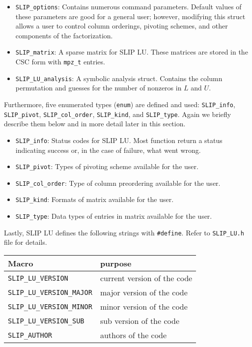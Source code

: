\documentclass[12pt]{article}
\theoremstyle{definition}
\begin{document}
\begin{itemize}
    \item \verb|SLIP_options|: Contains numerous command parameters. Default
    values of these parameters are good for a general user; however, modifying
    this struct allows a user to control column orderings, pivoting schemes,
    and other components of the factorization.

    \item \verb|SLIP_matrix|: A sparse matrix for SLIP LU. These matrices are
    stored in the CSC form with \verb|mpz_t| entries.

    \item \verb|SLIP_LU_analysis|: A symbolic analysis struct. Contains the
    column permutation and guesses for the number of nonzeros in $L$ and $U$.
\end{itemize}

Furthermore, five enumerated types (\verb|enum|) are defined and used:
\verb|SLIP_info|, \verb|SLIP_pivot|, \verb|SLIP_col_order|, \verb|SLIP_kind|,
and \verb|SLIP_type|. Again we briefly
describe them below and in more detail later in this section.

\begin{itemize}
    \item \verb|SLIP_info|: Status codes for SLIP LU. Most function return
    a status indicating success or, in the case of failure, what went wrong.
    \item \verb|SLIP_pivot|: Types of pivoting scheme available for the user.
    \item \verb|SLIP_col_order|: Type of column preordering available for the
    user.
    \item \verb|SLIP_kind|: Formats of matrix available for the user.
    \item \verb|SLIP_type|: Data types of entries in matrix available for the user.
\end{itemize}

Lastly, SLIP LU defines the following strings with \verb|#define|. Refer to
\verb|SLIP_LU.h| file for details.

\begin{center}
\begin{tabular}{ll}
\hline
Macro & purpose \\
\hline
\verb|SLIP_LU_VERSION|       &  current version of the code\\
\verb|SLIP_LU_VERSION_MAJOR| &  major version of the code\\
\verb|SLIP_LU_VERSION_MINOR| & minor version of the code   \\
\verb|SLIP_LU_VERSION_SUB|   &  sub version of the code\\
\hline
\verb|SLIP_AUTHOR|           & authors of the code \\
\hline
\end{tabular}
\end{center}
\end{document}
